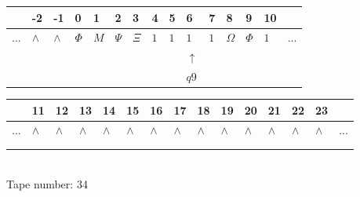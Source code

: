 \documentclass[11pt]{article}
\begin{document}
\begin{table}[H]
\centering
\begin{tabular}{lllllllllllllll}
 & -2 & -1 & 0 & 1 & 2 & 3 & 4 & 5 & 6 & 7 & 8 & 9 & 10 & \\
\hline
$...$ & \multicolumn{1}{|l|}{$\wedge$} & \multicolumn{1}{|l|}{$\wedge$} & \multicolumn{1}{|l|}{$\Phi$} & \multicolumn{1}{|l|}{$M$} & \multicolumn{1}{|l|}{$\Psi$} & \multicolumn{1}{|l|}{$\Xi$} & \multicolumn{1}{|l|}{$1$} & \multicolumn{1}{|l|}{$1$} & \multicolumn{1}{|l|}{$1$} & \multicolumn{1}{|l|}{$1$} & \multicolumn{1}{|l|}{$\Omega$} & \multicolumn{1}{|l|}{$\Phi$} & \multicolumn{1}{|l|}{$1$} & $...$\\
\hline
&  &  &  &  &  &  &  &  & $\uparrow$ &  &  &  &  &  \\
&  &  &  &  &  &  &  &  & $ q9 $ &  &  &  &  &  \\
\end{tabular}
\begin{tabular}{lllllllllllllll}
 & 11 & 12 & 13 & 14 & 15 & 16 & 17 & 18 & 19 & 20 & 21 & 22 & 23 & \\
\hline
$...$ & \multicolumn{1}{|l|}{$\wedge$} & \multicolumn{1}{|l|}{$\wedge$} & \multicolumn{1}{|l|}{$\wedge$} & \multicolumn{1}{|l|}{$\wedge$} & \multicolumn{1}{|l|}{$\wedge$} & \multicolumn{1}{|l|}{$\wedge$} & \multicolumn{1}{|l|}{$\wedge$} & \multicolumn{1}{|l|}{$\wedge$} & \multicolumn{1}{|l|}{$\wedge$} & \multicolumn{1}{|l|}{$\wedge$} & \multicolumn{1}{|l|}{$\wedge$} & \multicolumn{1}{|l|}{$\wedge$} & \multicolumn{1}{|l|}{$\wedge$} & $...$\\
\hline
&  &  &  &  &  &  &  &  &  &  &  &  &  &  \\
&  &  &  &  &  &  &  &  &  &  &  &  &  &  \\
\end{tabular}
\\
Tape number: 34
\noindent\makebox[\linewidth]{\hdashrule{\textwidth}{1pt}{1pt}}\end{table}
\end{document}
